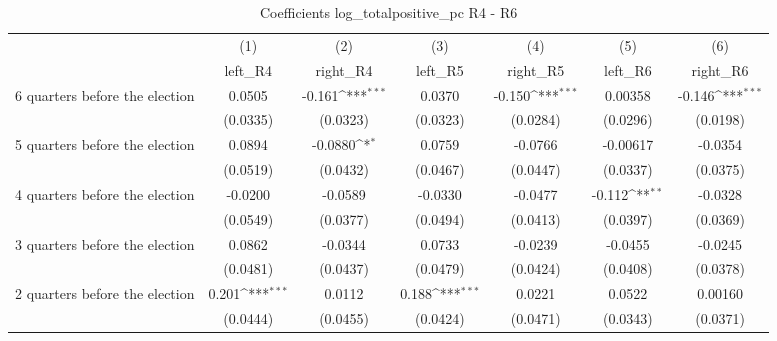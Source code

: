 \begin{table}[htbp]\centering
\def\sym#1{\ifmmode^{#1}\else\(^{#1}\)\fi}
\caption{Coefficients log\_totalpositive\_pc R4 - R6}
\begin{tabular}{l*{6}{c}}
\hline\hline
                    &\multicolumn{1}{c}{(1)}&\multicolumn{1}{c}{(2)}&\multicolumn{1}{c}{(3)}&\multicolumn{1}{c}{(4)}&\multicolumn{1}{c}{(5)}&\multicolumn{1}{c}{(6)}\\
                    &\multicolumn{1}{c}{left\_R4}&\multicolumn{1}{c}{right\_R4}&\multicolumn{1}{c}{left\_R5}&\multicolumn{1}{c}{right\_R5}&\multicolumn{1}{c}{left\_R6}&\multicolumn{1}{c}{right\_R6}\\
\hline
 6 quarters before the election&      0.0505         &      -0.161\sym{***}&      0.0370         &      -0.150\sym{***}&     0.00358         &      -0.146\sym{***}\\
                    &    (0.0335)         &    (0.0323)         &    (0.0323)         &    (0.0284)         &    (0.0296)         &    (0.0198)         \\
[1em]
 5 quarters before the election&      0.0894         &     -0.0880\sym{*}  &      0.0759         &     -0.0766         &    -0.00617         &     -0.0354         \\
                    &    (0.0519)         &    (0.0432)         &    (0.0467)         &    (0.0447)         &    (0.0337)         &    (0.0375)         \\
[1em]
 4 quarters before the election&     -0.0200         &     -0.0589         &     -0.0330         &     -0.0477         &      -0.112\sym{**} &     -0.0328         \\
                    &    (0.0549)         &    (0.0377)         &    (0.0494)         &    (0.0413)         &    (0.0397)         &    (0.0369)         \\
[1em]
 3 quarters before the election&      0.0862         &     -0.0344         &      0.0733         &     -0.0239         &     -0.0455         &     -0.0245         \\
                    &    (0.0481)         &    (0.0437)         &    (0.0479)         &    (0.0424)         &    (0.0408)         &    (0.0378)         \\
[1em]
 2 quarters before the election&       0.201\sym{***}&      0.0112         &       0.188\sym{***}&      0.0221         &      0.0522         &     0.00160         \\
                    &    (0.0444)         &    (0.0455)         &    (0.0424)         &    (0.0471)         &    (0.0343)         &    (0.0371)         \\

\end{tabular}
\end{table}

